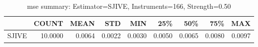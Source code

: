 \begin{table}[ht]
\centering
\caption{mse summary: Estimator=SJIVE, Instruments=166, Strength=0.50}
\begin{tabular}{lrrrrrrrr}
\toprule
 & COUNT & MEAN & STD & MIN & 25\% & 50\% & 75\% & MAX \\
\midrule
SJIVE & 10.0000 & 0.0064 & 0.0022 & 0.0030 & 0.0050 & 0.0065 & 0.0080 & 0.0097 \\
\bottomrule
\end{tabular}
\end{table}
